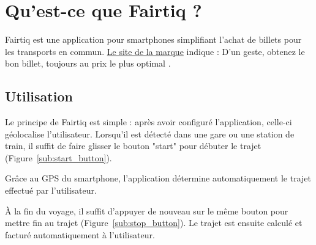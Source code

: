 \documentclass[a4paper]{article}
\begin{document}
\clearpage

\tableofcontents

\clearpage


\section{Qu'est-ce que Fairtiq ?}



Fairtiq est une application pour smartphones simplifiant l'achat de billets pour les transports en commun.
\href{https://fairtiq.com/fr}{Le site de la marque} indique : \og D’un geste, obtenez le bon billet, toujours au prix le plus optimal \fg.

\subsection{Utilisation}
Le principe de Fairtiq est simple : après avoir configuré l'application, celle-ci géolocalise l'utilisateur.
Lorsqu'il est détecté dans une gare ou une station de train, il suffit de faire glisser le bouton "start"
pour débuter le trajet (Figure~\ref{sub:start_button}).

Grâce au GPS du smartphone,
l'application détermine automatiquement le trajet effectué par l'utilisateur.

À la fin du voyage, il suffit d'appuyer de nouveau sur le même bouton pour mettre fin au trajet (Figure~\ref{sub:stop_button}). Le trajet est ensuite calculé et facturé automatiquement à l'utilisateur.
\end{document}
